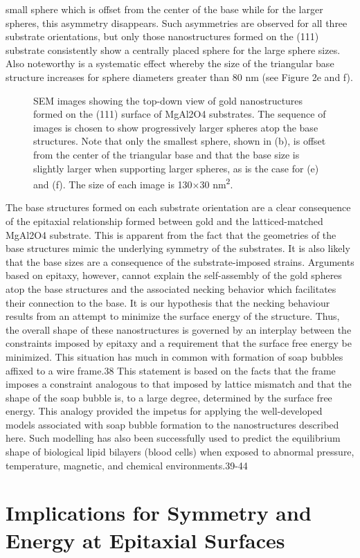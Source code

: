 small sphere which is offset from the center of the base while for the larger spheres, this asymmetry disappears. Such
asymmetries are observed for all three substrate orientations,
but only those nanostructures formed on the (111) substrate
consistently show a centrally placed sphere for the large
sphere sizes. Also noteworthy is a systematic effect whereby
the size of the triangular base structure increases for sphere
diameters greater than 80 nm (see Figure 2e and f).
\begin{figure}
    \centering
    \caption{\label{fig:nanogold_progression}SEM images showing the top-down view of gold
        nanostructures formed on the (111) surface of MgAl2O4 substrates.
        The sequence of images is chosen to show progressively larger
        spheres atop the base structures. Note that only the smallest sphere,
        shown in (b), is offset from the center of the triangular base and
        that the base size is slightly larger when supporting larger spheres,
        as is the case for (e) and (f). The size of each image is 130$\times$30
        nm\textsuperscript{2}.}
\end{figure}
The base structures formed on each substrate orientation
are a clear consequence of the epitaxial relationship formed
between gold and the latticed-matched MgAl2O4 substrate.
This is apparent from the fact that the geometries of the base
structures mimic the underlying symmetry of the substrates.
It is also likely that the base sizes are a consequence of the
substrate-imposed strains. Arguments based on epitaxy,
however, cannot explain the self-assembly of the gold spheres
atop the base structures and the associated necking behavior
which facilitates their connection to the base. It is our
hypothesis that the necking behaviour results from an attempt
to minimize the surface energy of the structure. Thus, the
overall shape of these nanostructures is governed by an
interplay between the constraints imposed by epitaxy and a
requirement that the surface free energy be minimized. This
situation has much in common with formation of soap
bubbles affixed to a wire frame.38 This statement is based
on the facts that the frame imposes a constraint analogous
to that imposed by lattice mismatch and that the shape of
the soap bubble is, to a large degree, determined by the
surface free energy. This analogy provided the impetus for
applying the well-developed models associated with soap
bubble formation to the nanostructures described here. Such
modelling has also been successfully used to predict the
equilibrium shape of biological lipid bilayers (blood cells)
when exposed to abnormal pressure, temperature, magnetic,
and chemical environments.39-44
\section{Implications for Symmetry and Energy at Epitaxial Surfaces}